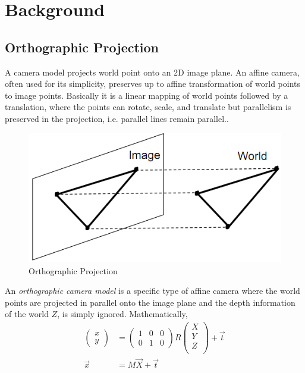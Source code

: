 \section{Background}

\subsection{Orthographic Projection}
\label{sec:ortho}
A camera model projects world point onto an 2D image plane. An affine camera, often used for
its simplicity, preserves up to affine transformation of world points
to image points. Basically it is a linear mapping of world points followed by a translation, where
the points can rotate, scale, and translate but parallelism is
preserved in the projection, i.e. parallel lines remain parallel.\cite[p.38]{Szelski}. 
\begin{figure}[!ht]
  \begin{center}
  \includegraphics[scale=0.6]{ortho.png}
  \caption{Orthographic Projection} 
  \label{figures:ortho}
  \end{center}
\end{figure}
An \emph{orthographic
camera model} is a specific type of affine camera where the world
points are projected in parallel onto the image plane and the depth
information of the world $Z$, is simply ignored. Mathematically, 
\begin{align*}
\begin{pmatrix}
  x\\y
\end{pmatrix} &= \begin{pmatrix}
  1& 0&0 \\0 & 1 & 0
\end{pmatrix}
R
\begin{pmatrix}
  X\\Y\\Z\\
\end{pmatrix} + \vec t\\
\vec x &= M\vec X + \vec t
\end{align*}
